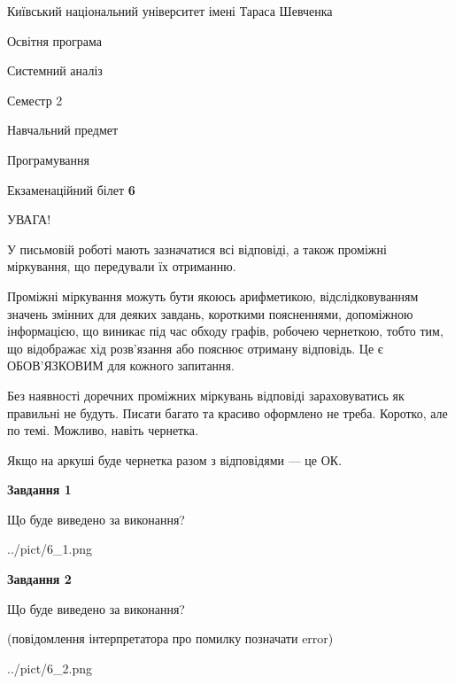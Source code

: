 \documentclass[12pt, ukrainian]{article}
\begin{document}
{{\begin {small}\par
{ \center  Київський національний університет імені Тараса Шевченка \par}
{\parbox {5 cm}{Освітня програма \hfill}{\parbox {7 cm}{Системний аналіз \hfill}}\parbox {6 cm}{\hfill Семестр 2}}\par
{\parbox {5 cm} {Навчальний предмет \hfill}\parbox {7 cm}{Програмування \hfill}\parbox {6cm}{\hfill}\par}\vspace{-7pt} \end{small}}{\center Екзаменаційний білет \No \textbf
{ 6 }\par}}
{
\begin {large}
УВАГА!

У письмовій роботі мають зазначатися всі відповіді, а також проміжні міркування, що передували їх отриманню.

Проміжні міркування можуть бути якоюсь арифметикою, відслідковуванням зна\-чень змінних для деяких завдань,
короткими поясненнями, допоміжною інформацією, що виникає під час обходу графів, робочею чернеткою,
тобто тим, що відображає хід розв’язання або пояснює отриману відповідь.
Це є ОБОВ’ЯЗКОВИМ для кожного запитання.

Без наявності доречних проміжних міркувань відповіді зараховуватись як правиль\-ні не будуть.
Писати багато та красиво оформлено не треба. Коротко, але по темі. Можли\-во, навіть чернетка.

Якщо на аркуші буде чернетка разом з відповідями --- це ОК.

\newpage

{\begin {center}\textbf{Завдання 1}\end {center}}\par
Що буде виведено за виконання?\par
\begin{center}
	{../pict/6_1.png}
\end{center}
\newpage

{\begin {center}\textbf{Завдання 2}\end {center}}\par
Що буде виведено за виконання?\par
 (повідомлення інтерпретатора про помилку позначати error)\par
\begin{center}
	{../pict/6_2.png}
\end{center}
\newpage


\end{large}}
\end{document}
